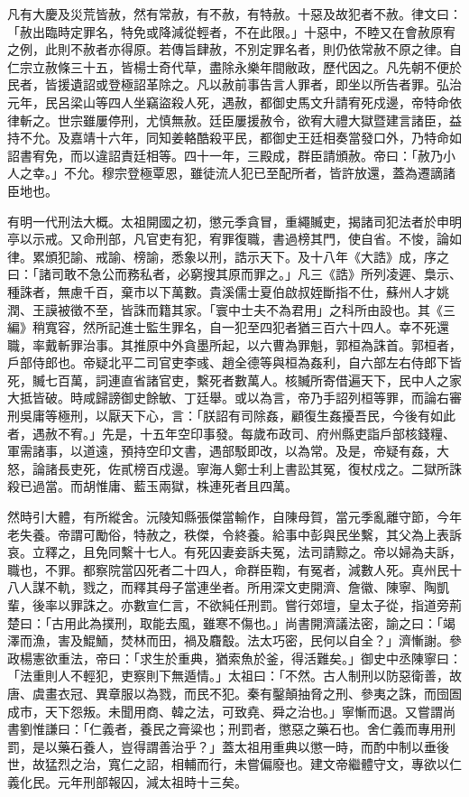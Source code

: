 凡有大慶及災荒皆赦，然有常赦，有不赦，有特赦。十惡及故犯者不赦。律文曰：「赦出臨時定罪名，特免或降減從輕者，不在此限。」十惡中，不睦又在會赦原宥之例，此則不赦者亦得原。若傳旨肆赦，不別定罪名者，則仍依常赦不原之律。自仁宗立赦條三十五，皆楊士奇代草，盡除永樂年間敝政，歷代因之。凡先朝不便於民者，皆援遺詔或登極詔革除之。凡以赦前事告言人罪者，即坐以所告者罪。弘治元年，民呂梁山等四人坐竊盜殺人死，遇赦，都御史馬文升請宥死戍邊，帝特命依律斬之。世宗雖屢停刑，尤慎無赦。廷臣屢援赦令，欲宥大禮大獄暨建言諸臣，益持不允。及嘉靖十六年，同知姜輅酷殺平民，都御史王廷相奏當發口外，乃特命如詔書宥免，而以違詔責廷相等。四十一年，三殿成，群臣請頒赦。帝曰：「赦乃小人之幸。」不允。穆宗登極覃恩，雖徒流人犯已至配所者，皆許放還，蓋為遷謫諸臣地也。

有明一代刑法大概。太祖開國之初，懲元季貪冒，重繩贓吏，揭諸司犯法者於申明亭以示戒。又命刑部，凡官吏有犯，宥罪復職，書過榜其門，使自省。不悛，論如律。累頒犯諭、戒諭、榜諭，悉象以刑，誥示天下。及十八年《大誥》成，序之曰：「諸司敢不急公而務私者，必窮搜其原而罪之。」凡三《誥》所列凌遲、梟示、種誅者，無慮千百，棄市以下萬數。貴溪儒士夏伯啟叔姪斷指不仕，蘇州人才姚潤、王謨被徵不至，皆誅而籍其家。「寰中士夫不為君用」之科所由設也。其《三編》稍寬容，然所記進士監生罪名，自一犯至四犯者猶三百六十四人。幸不死還職，率戴斬罪治事。其推原中外貪墨所起，以六曹為罪魁，郭桓為誅首。郭桓者，戶部侍郎也。帝疑北平二司官吏李彧、趙全德等與桓為姦利，自六部左右侍郎下皆死，贓七百萬，詞連直省諸官吏，繫死者數萬人。核贓所寄借遍天下，民中人之家大抵皆破。時咸歸謗御史餘敏、丁廷舉。或以為言，帝乃手詔列桓等罪，而論右審刑吳庸等極刑，以厭天下心，言：「朕詔有司除姦，顧復生姦擾吾民，今後有如此者，遇赦不宥。」先是，十五年空印事發。每歲布政司、府州縣吏詣戶部核錢糧、軍需諸事，以道遠，預持空印文書，遇部駁即改，以為常。及是，帝疑有姦，大怒，論諸長吏死，佐貳榜百戍邊。寧海人鄭士利上書訟其冤，復杖戍之。二獄所誅殺已過當。而胡惟庸、藍玉兩獄，株連死者且四萬。

然時引大體，有所縱舍。沅陵知縣張傑當輸作，自陳母賀，當元季亂離守節，今年老失養。帝謂可勵俗，特赦之，秩傑，令終養。給事中彭與民坐繫，其父為上表訴哀。立釋之，且免同繫十七人。有死囚妻妾訴夫冤，法司請黥之。帝以婦為夫訴，職也，不罪。都察院當囚死者二十四人，命群臣鞫，有冤者，減數人死。真州民十八人謀不軌，戮之，而釋其母子當連坐者。所用深文吏開濟、詹徽、陳寧、陶凱輩，後率以罪誅之。亦數宣仁言，不欲純任刑罰。嘗行郊壇，皇太子從，指道旁荊楚曰：「古用此為撲刑，取能去風，雖寒不傷也。」尚書開濟議法密，諭之曰：「竭澤而漁，害及鯤鮞，焚林而田，禍及麛鷇。法太巧密，民何以自全？」濟慚謝。參政楊憲欲重法，帝曰：「求生於重典，猶索魚於釜，得活難矣。」御史中丞陳寧曰：「法重則人不輕犯，吏察則下無遁情。」太祖曰：「不然。古人制刑以防惡衛善，故唐、虞畫衣冠、異章服以為戮，而民不犯。秦有鑿顛抽脅之刑、參夷之誅，而囹圄成市，天下怨叛。未聞用商、韓之法，可致堯、舜之治也。」寧慚而退。又嘗謂尚書劉惟謙曰：「仁義者，養民之膏粱也；刑罰者，懲惡之藥石也。舍仁義而專用刑罰，是以藥石養人，豈得謂善治乎？」蓋太祖用重典以懲一時，而酌中制以垂後世，故猛烈之治，寬仁之詔，相輔而行，未嘗偏廢也。建文帝繼體守文，專欲以仁義化民。元年刑部報囚，減太祖時十三矣。

